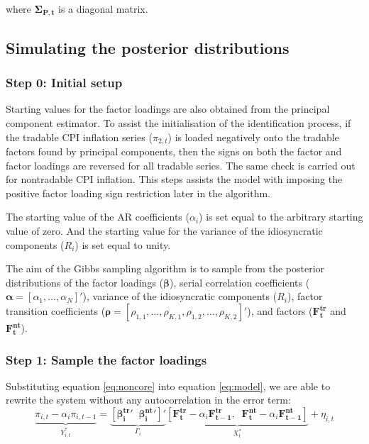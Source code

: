 \documentclass[11pt,english,a4paper]{article}
\begin{document}
where $\boldsymbol{\Sigma_{P,t}}$ is a diagonal matrix.

\subsection*{Simulating the posterior distributions}

\subsubsection*{Step 0: Initial  setup}

Starting values for the factor loadings are also obtained from the principal component estimator. To assist the initialisation of the identification process, if the tradable CPI inflation series ($\pi_{2,t}$) is loaded negatively onto the tradable factors found by principal components, then the signs on both the factor and factor loadings are reversed for all tradable series. The same check is carried out for nontradable CPI inflation. This steps assists the model with imposing the positive factor loading sign restriction later in the algorithm.

The starting value of the AR coefficients ($\alpha_{i}$) is set equal to the arbitrary starting value of zero. And the starting value for the variance of the idiosyncratic components ($R_{i}$) is set equal to unity.

The aim of the Gibbs sampling algorithm is to sample from the posterior distributions of the factor loadings ($\boldsymbol{\beta}$), serial correlation coefficients ($\boldsymbol{\alpha} = [\alpha_{1}, \ldots, \alpha_{N}]'$), variance of the idiosyncratic components ($R_{i}$), factor transition coefficients ($\boldsymbol{\rho} = [\rho_{1,1}, \ldots, \rho_{K,1}, \rho_{1,2}, \ldots, \rho_{K,2}]'$), and factors ($\mathbf{F^{tr}_{t}}$ and $\mathbf{F^{nt}_{t}}$).



\subsubsection*{Step 1: Sample the factor loadings}

Substituting equation \ref{eq:noncore} into equation \ref{eq:model}, we are able to rewrite the system without any autocorrelation in the error term:
\begin{equation}
\underbrace{\pi_{i,t}- \alpha_{i}\pi_{i,t-1}}_{Y^{*}_{i,t}} = \underbrace{[\boldsymbol{\beta^{tr}_{i}}' \; \; \boldsymbol{\beta^{nt}_{i}}']'}_{\Gamma_{i}} \underbrace{[\mathbf{F^{tr}_{t}} - \alpha_{i} \mathbf{F^{tr}_{t-1}},  \; \; \mathbf{F^{nt}_{t}} - \alpha_{i} \mathbf{F^{nt}_{t-1}} ]}_{X^{*}_{t}}  + \eta_{i,t}
\end{equation}
\end{document}
